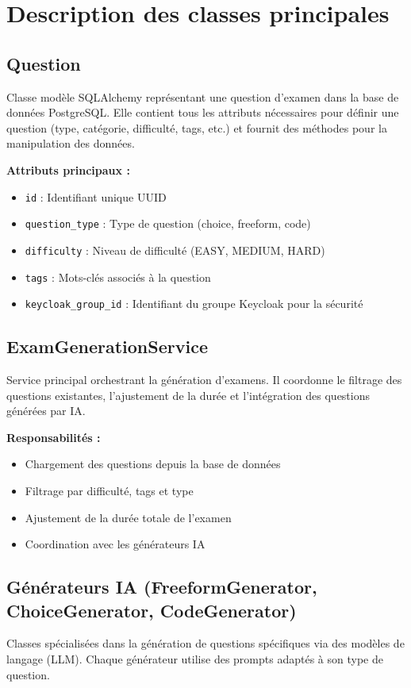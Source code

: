 \documentclass{report}
\begin{document}
\section{Description des classes principales}

\subsection{Question}
Classe modèle SQLAlchemy représentant une question d'examen dans la base de données PostgreSQL. Elle contient tous les attributs nécessaires pour définir une question (type, catégorie, difficulté, tags, etc.) et fournit des méthodes pour la manipulation des données.

\textbf{Attributs principaux :}
\begin{itemize}
    \item \texttt{id} : Identifiant unique UUID
    \item \texttt{question\_type} : Type de question (choice, freeform, code)
    \item \texttt{difficulty} : Niveau de difficulté (EASY, MEDIUM, HARD)
    \item \texttt{tags} : Mots-clés associés à la question
    \item \texttt{keycloak\_group\_id} : Identifiant du groupe Keycloak pour la sécurité
\end{itemize}

\subsection{ExamGenerationService}
Service principal orchestrant la génération d'examens. Il coordonne le filtrage des questions existantes, l'ajustement de la durée et l'intégration des questions générées par IA.

\textbf{Responsabilités :}
\begin{itemize}
    \item Chargement des questions depuis la base de données
    \item Filtrage par difficulté, tags et type
    \item Ajustement de la durée totale de l'examen
    \item Coordination avec les générateurs IA
\end{itemize}

\subsection{Générateurs IA (FreeformGenerator, ChoiceGenerator, CodeGenerator)}
Classes spécialisées dans la génération de questions spécifiques via des modèles de langage (LLM). Chaque générateur utilise des prompts adaptés à son type de question.
\end{document}
